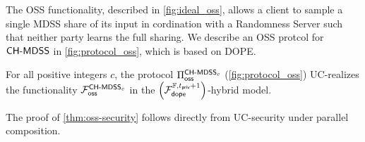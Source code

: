 The OSS functionality, described in \cref{fig:ideal_oss}, allows a client to sample a single MDSS share of its input in cordination with a Randomness Server such that neither party learns the full sharing.
We describe an OSS protcol for $\chmdss$ in \cref{fig:protocol_oss}, which is based on DOPE.




\begin{theorem}
	\label{thm:oss-security}
	For all positive integers $c$, the protocol $\poss$ (\cref{fig:protocol_oss}) UC-realizes the functionality $\mathcal{F}_{\sf oss}^{\chmdss_c}$ in the $\left(\fdope[\pd + 1]\right)$-hybrid model.
\end{theorem}

The proof of \cref{thm:oss-security} follows directly from UC-security under parallel composition.
